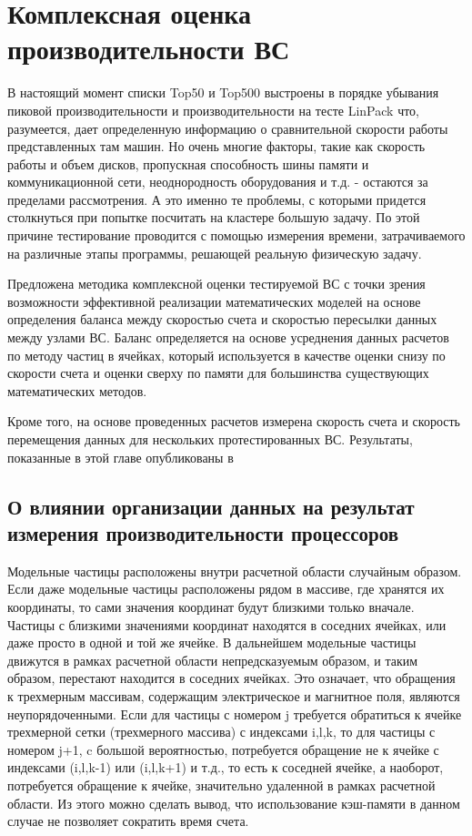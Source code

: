\chapter{Комплексная оценка производительности ВС}



В настоящий момент списки Top50 и Top500
выстроены в порядке убывания пиковой производительности и производительности на тесте LinPack что, разумеется, дает определенную информацию
о сравнительной скорости работы представленных там машин. Но очень многие факторы, такие как скорость работы и объем дисков, пропускная 
способность шины памяти и коммуникационной сети, неоднородность оборудования и т.д. - остаются за пределами рассмотрения. А это именно те 
проблемы, с которыми придется столкнуться при попытке посчитать на кластере большую задачу. По этой причине тестирование проводится с помощью измерения времени, затрачиваемого на различные этапы программы, решающей реальную физическую задачу.




Предложена методика комплексной оценки тестируемой ВС с точки зрения возможности эффективной реализации математических моделей на основе определения баланса между скоростью счета и скоростью пересылки данных между узлами ВС. Баланс определяется на основе усреднения данных расчетов по методу частиц в ячейках, который используется в качестве оценки снизу по скорости счета и оценки сверху по памяти для большинства существующих математических методов.

Кроме того, на основе проведенных расчетов измерена скорость счета и скорость перемещения данных для нескольких протестированных ВС. Результаты, показанные в этой главе опубликованы в \cite{VestnikNNSU,NumMethMultiLevel,SuperFrI,integrApproach}   

		


\section{О влиянии организации данных на результат измерения производительности процессоров}
\label{procs_influence}

Модельные частицы расположены внутри расчетной области случайным образом. Если даже модельные частицы расположены рядом в массиве, где хранятся их координаты,  то сами значения координат будут близкими только вначале. Частицы с близкими значениями координат находятся в соседних ячейках, или даже просто в одной и той же ячейке. В дальнейшем модельные частицы движутся в рамках расчетной области непредсказуемым образом, и таким образом, перестают находится в соседних ячейках. Это означает, что обращения к трехмерным массивам, содержащим электрическое и магнитное поля, являются неупорядоченными. Если для частицы с номером j требуется обратиться к ячейке трехмерной сетки (трехмерного массива) с индексами i,l,k, то для частицы с номером j+1, c большой вероятностью, потребуется обращение не к ячейке с индексами (i,l,k-1) или (i,l,k+1) и т.д., то есть к соседней ячейке, а наоборот, потребуется обращение к ячейке, значительно удаленной в рамках расчетной области. 
Из этого можно сделать вывод, что использование кэш-памяти в данном случае не позволяет сократить время счета. 

